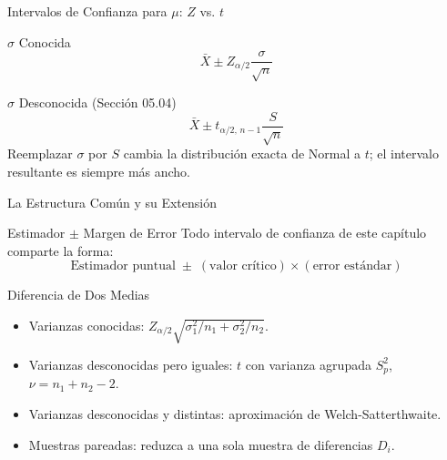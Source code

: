 \documentclass[10pt, aspectratio=169]{beamer}
\begin{document}
\begin{frame}{Intervalos de Confianza para $\mu$: $Z$ vs. $t$}
  \footnotesize
  \begin{block}{$\sigma$ Conocida}
    $$\bar X \pm Z_{\alpha/2}\dfrac{\sigma}{\sqrt n}$$
  \end{block}
  \pause

  \vspace{0.1cm}
  \begin{alertblock}{$\sigma$ Desconocida (Sección 05.04)}
    $$\bar X \pm t_{\alpha/2,\,n-1}\dfrac{S}{\sqrt n}$$
    Reemplazar $\sigma$ por $S$ cambia la distribución exacta de Normal a $t$; el intervalo resultante es siempre más ancho.
  \end{alertblock}
\end{frame}

\begin{frame}{La Estructura Común y su Extensión}
  \footnotesize
  \begin{block}{Estimador $\pm$ Margen de Error}
    Todo intervalo de confianza de este capítulo comparte la forma:
    $$\text{Estimador puntual} \;\pm\; (\text{valor crítico}) \times (\text{error estándar})$$
  \end{block}

  \vspace{0.1cm}
  \pause
  \begin{alertblock}{Diferencia de Dos Medias}
    \begin{itemize}\itemsep=0.05cm
      \item Varianzas conocidas: $Z_{\alpha/2}\sqrt{\sigma_1^2/n_1+\sigma_2^2/n_2}$.
      \item Varianzas desconocidas pero iguales: $t$ con varianza agrupada $S_p^2$, $\nu=n_1+n_2-2$.
      \item Varianzas desconocidas y distintas: aproximación de Welch-Satterthwaite.
      \item Muestras pareadas: reduzca a una sola muestra de diferencias $D_i$.
    \end{itemize}
  \end{alertblock}
\end{frame}
\end{document}
